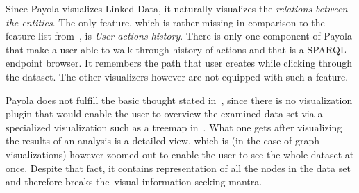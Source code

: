 Since Payola visualizes Linked Data, it naturally visualizes the \emph{relations between the entities}.
The only feature, which is rather missing in comparison to the feature list from~\cite{mantra}, is
\emph{User actions history}.
There is only one component of Payola that make a user able to walk through 
history of actions and that is a SPARQL endpoint browser. It remembers the path 
that user creates while clicking through the dataset. The other visualizers 
however are not equipped with such a feature.

Payola does not fulfill the basic thought stated in~\cite{mantra}, since 
there is no visualization plugin that would enable the user to overview the 
examined data set via a specialized visualization such as a treemap 
in~\cite{lodvis}. What one gets after visualizing the results of an analysis is a 
detailed view, which is (in the case of graph visualizations) however zoomed out
to enable the user to see the whole dataset at once. Despite that fact, it 
contains representation of all the nodes in the data set and therefore breaks 
the~visual information seeking mantra.
